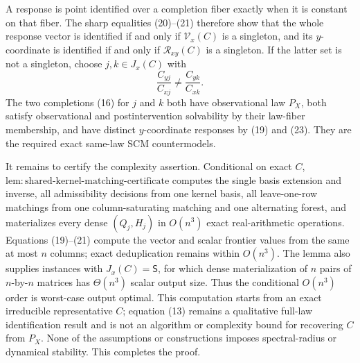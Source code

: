 A response is point identified over a completion fiber exactly when it is constant on that fiber. The sharp equalities (20)--(21) therefore show that the whole response vector is identified if and only if \(\mathcal V_x(C)\) is a singleton, and its \(y\)-coordinate is identified if and only if \(\mathcal R_{xy}(C)\) is a singleton. If the latter set is not a singleton, choose \(j,k\in J_x(C)\) with
\[
 \frac{C_{yj}}{C_{xj}}\ne\frac{C_{yk}}{C_{xk}}. \tag{23}
\]
The two completions (16) for \(j\) and \(k\) both have observational law \(P_X\), both satisfy observational and postintervention solvability by their law-fiber membership, and have distinct \(y\)-coordinate responses by (19) and (23). They are the required exact same-law SCM countermodels.

It remains to certify the complexity assertion. Conditional on exact \(C\), \(\mathrm{lem:shared\text{-}kernel\text{-}matching\text{-}certificate}\) computes the single basis extension and inverse, all admissibility decisions from one kernel basis, all leave-one-row matchings from one column-saturating matching and one alternating forest, and materializes every dense \((Q_j,H_j)\) in \(O(n^3)\) exact real-arithmetic operations. Equations (19)--(21) compute the vector and scalar frontier values from the same at most \(n\) columns; exact deduplication remains within \(O(n^3)\). The lemma also supplies instances with \(J_x(C)=\mathsf S\), for which dense materialization of \(n\) pairs of \(n\)-by-\(n\) matrices has \(\Theta(n^3)\) scalar output size. Thus the conditional \(O(n^3)\) order is worst-case output optimal. This computation starts from an exact irreducible representative \(C\); equation (13) remains a qualitative full-law identification result and is not an algorithm or complexity bound for recovering \(C\) from \(P_X\). None of the assumptions or constructions imposes spectral-radius or dynamical stability. This completes the proof.